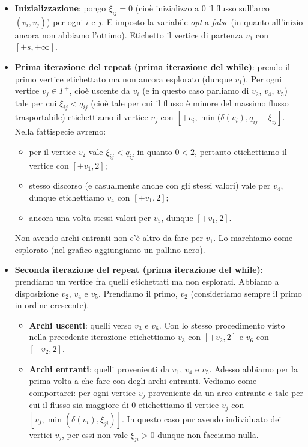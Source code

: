 \documentclass[11pt]{book}
\begin{document}
\begin{itemize}

\item {\bf Inizializzazione}: pongo $\xi_{ij} = 0$ (cio\`e inizializzo
  a 0 il flusso sull'arco $(v_i,v_j)$) per ogni $i$ e $j$. E imposto
  la variabile {\em opt} a {\em false} (in quanto all'inizio ancora
  non abbiamo l'ottimo). Etichetto il vertice di partenza $v_1$ con
  $[+s, +\infty]$.
  
\item {\bf Prima iterazione del repeat (prima iterazione del while)}:
  prendo il primo vertice etichettato ma non ancora esplorato (dunque
  $v_1$). Per ogni vertice $v_j \in \Gamma^+$, cio\`e uscente da $v_i$
  (e in questo caso parliamo di $v_2$, $v_4$, $v_5$) tale per cui
  $\xi_{ij} < q_{ij}$ (cio\`e tale per cui il flusso \`e minore del
  massimo flusso trasportabile) etichettiamo il vertice $v_j$ con
  $[+v_i, \min(\delta(v_i), q_{ij}-\xi_{ij}]$. Nella fattispecie
  avremo:

  \begin{itemize}
  \item per il vertice $v_2$ vale $\xi_{ij} < q_{ij}$ in quanto $0 <
    2$, pertanto etichettiamo il vertice con $[+v_1, 2]$;
  \item stesso discorso (e casualmente anche con gli stessi valori)
    vale per $v_4$, dunque etichettiamo $v_4$ con $[+v_1, 2]$;
  \item ancora una volta stessi valori per $v_5$, dunque $[+v_1, 2]$.
  \end{itemize}

  Non avendo archi entranti non c'\`e altro da fare per $v_1$. Lo
  marchiamo come esplorato (nel grafico aggiungiamo un pallino nero).

\item {\bf Seconda iterazione del repeat (prima iterazione del
  while)}: prendiamo un vertice fra quelli etichettati ma non
  esplorati. Abbiamo a disposizione $v_2$, $v_4$ e $v_5$. Prendiamo il
  primo, $v_2$ (consideriamo sempre il primo in ordine crescente).

  \begin{itemize} 
  \item {\bf Archi uscenti}: quelli verso $v_3$ e $v_6$. Con lo stesso
    procedimento visto nella precedente iterazione etichettiamo $v_3$
    con $[+v_2, 2]$ e $v_6$ con $[+v_2, 2]$.

  \item {\bf Archi entranti}: quelli provenienti da $v_1$, $v_4$ e
    $v_5$. Adesso abbiamo per la prima volta a che fare con degli
    archi entranti. Vediamo come comportarci: per ogni vertice $v_j$
    proveniente da un arco entrante e tale per cui il flusso sia
    maggiore di 0 etichettiamo il vertice $v_j$ con $[v_j,
      \min(\delta(v_i),\xi_{ji})]$. In questo caso pur avendo
    individuato dei vertici $v_j$, per essi non vale $\xi_{ji} > 0$
    dunque non facciamo nulla. 
  \end{itemize} 


\end{itemize}
\end{document}
